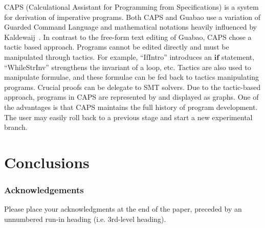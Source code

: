 \documentclass[runningheads]{llncs}
\begin{document}
CAPS (Calculational Assistant for Programming from Specifications) \cite{Chaudhari:14:Automated,Chaudhari:15:Building} is a system for derivation of imperative programs.
Both CAPS and Guabao use a variation of Guarded Command Language and mathematical notations heavily influenced by Kaldewaij~\cite{Kaldewaij:90:Programming}.
In contrast to the free-form text editing of Guabao, CAPS chose a tactic based approach.
Programs cannot be edited directly and must be manipulated through tactics.
For example, ``IfIntro'' introduces an \ensuremath{\mathbf{if}} statement,
``WhileStrInv'' strengthens the invariant of a loop, etc.
Tactics are also used to manipulate formulae, and these formulae can be fed back to tactics manipulating programs.
Crucial proofs can be delegate to SMT solvers.
Due to the tactic-based approach, programs in CAPS are represented by and displayed as graphs.
One of the advantages is that CAPS maintains the full history of program development.
The user may easily roll back to a previous stage and start a new experimental branch.

\section{Conclusions}


\subsubsection{Acknowledgements} Please place your acknowledgments at
the end of the paper, preceded by an unnumbered run-in heading (i.e.
3rd-level heading).




%
\end{document}
